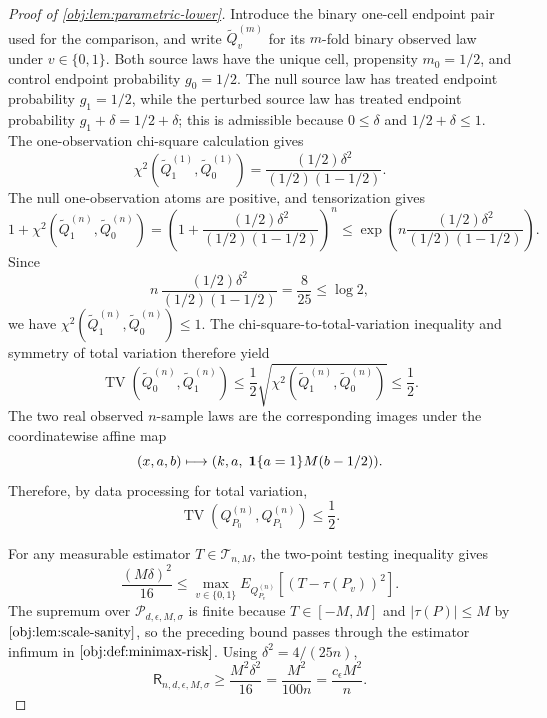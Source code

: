 \begin{proof}[Proof of \cref{obj:lem:parametric-lower}]
Introduce the binary one-cell endpoint pair used for the comparison, and write \(\widetilde Q_v^{(m)}\) for its \(m\)-fold binary observed law under \(v\in\{0,1\}\).  Both source laws have the unique cell, propensity \(m_0=1/2\), and control endpoint probability \(g_0=1/2\).  The null source law has treated endpoint probability \(g_1=1/2\), while the perturbed source law has treated endpoint probability \(g_1+\delta=1/2+\delta\); this is admissible because \(0\le\delta\) and \(1/2+\delta\le1\).  The one-observation chi-square calculation gives
\[
\chi^2\!\left(\widetilde Q_1^{(1)},\widetilde Q_0^{(1)}\right)
=
\frac{(1/2)\delta^2}{(1/2)(1-1/2)}.
\]
The null one-observation atoms are positive, and tensorization gives
\[
1+
\chi^2\!\left(\widetilde Q_1^{(n)},\widetilde Q_0^{(n)}\right)
=
\left(1+\frac{(1/2)\delta^2}{(1/2)(1-1/2)}\right)^n
\le
\exp\!\left(
 n\frac{(1/2)\delta^2}{(1/2)(1-1/2)}
\right).
\]
Since
\[
n\,
\frac{(1/2)\delta^2}{(1/2)(1-1/2)}
=
\frac{8}{25}
\le \log 2,
\]
we have \(\chi^2(\widetilde Q_1^{(n)},\widetilde Q_0^{(n)})\le1\).  The chi-square-to-total-variation inequality and symmetry of total variation therefore yield
\[
\operatorname{TV}\!\left(\widetilde Q_0^{(n)},\widetilde Q_1^{(n)}\right)
\le
\frac12\sqrt{\chi^2\!\left(\widetilde Q_1^{(n)},\widetilde Q_0^{(n)}\right)}
\le\frac12 .
\]
The two real observed \(n\)-sample laws are the corresponding images under the coordinatewise affine map
\[
(x,a,b)\longmapsto (k,a,\;{\bf 1}\{a=1\}M(b-1/2)).
\]
Therefore, by data processing for total variation,
\[
\operatorname{TV}\!\left(Q_{P_0}^{(n)},Q_{P_1}^{(n)}\right)\le\frac12 .
\]

For any measurable estimator \(T\in\mathcal T_{n,M}\), the two-point testing inequality gives
\[
\frac{(M\delta)^2}{16}
\le
\max_{v\in\{0,1\}}
E_{Q_{P_v}^{(n)}}\!\left[(T-\tau(P_v))^2\right].
\]
The supremum over \(\mathcal P_{d,\epsilon,M,\sigma}\) is finite because \(T\in[-M,M]\) and \(|\tau(P)|\le M\) by \(\cref{obj:lem:scale-sanity}\), so the preceding bound passes through the estimator infimum in \(\cref{obj:def:minimax-risk}\). %
Using \(\delta^2=4/(25n)\),
\[
\mathsf R_{n,d,\epsilon,M,\sigma}
\ge
\frac{M^2\delta^2}{16}
=
\frac{M^2}{100n}
=
\frac{c_\epsilon M^2}{n}.
\]
\end{proof}
